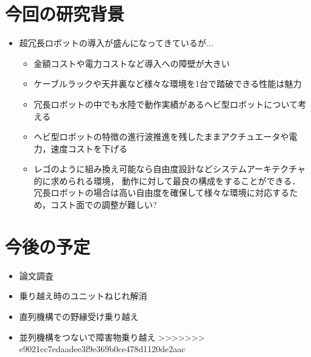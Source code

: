 	
\section*{今回の研究背景}
\begin{itemize}
	\item{超冗長ロボットの導入が盛んになってきているが...}
	\begin{itemize}
		\item {金額コストや電力コストなど導入への障壁が大きい}
		\item {ケーブルラックや天井裏など様々な環境を1台で踏破できる性能は魅力}
		\item {冗長ロボットの中でも水陸で動作実績があるヘビ型ロボットについて考える}
		\item {ヘビ型ロボットの特徴の進行波推進を残したままアクチュエータや電力，速度コストを下げる}
		\item {レゴのように組み換え可能なら自由度設計などシステムアーキテクチャ的に求められる環境，
		動作に対して最良の構成をすることができる．\\
		冗長ロボットの場合は高い自由度を確保して様々な環境に対応するため，コスト面での調整が難しい?}
	\end{itemize}
\end{itemize}

\section*{今後の予定}
	\begin{itemize}
		\item{論文調査}
		\item {乗り越え時のユニットねじれ解消}
		\item {直列機構での野縁受け乗り越え}
		\item {並列機構をつないで障害物乗り越え}
>>>>>>> e9021cc7edaadee3f9e369b0ce478d1120de2aac
	\end{itemize}